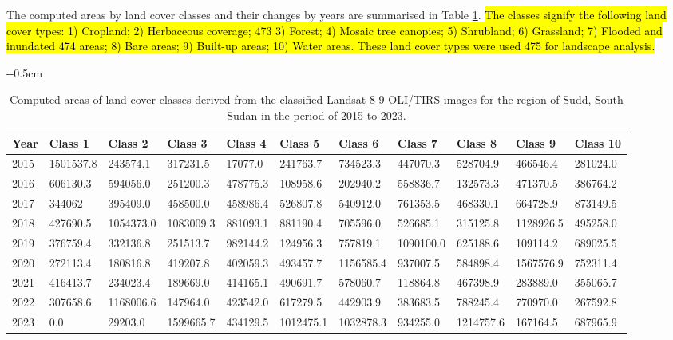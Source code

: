 \documentclass[analytics,article,submit,pdftex,moreauthors]{Definitions/mdpi}
\begin{document}
The computed areas by land cover classes and their changes by years are summarised in Table \ref{tab02}. \hl{The classes signify the following land cover types: 1) Cropland; 2) Herbaceous coverage; 473 3) Forest; 4) Mosaic tree canopies; 5) Shrubland; 6) Grassland; 7) Flooded and inundated 474 areas; 8) Bare areas; 9) Built-up areas; 10) Water areas. These land cover types were used 475 for landscape analysis. }

\begin{table}[H]
    \caption{Computed areas of land cover classes derived from the classified Landsat 8-9 OLI/TIRS images for the region of Sudd, South Sudan in the period of 2015 to 2023.\label{tab02}}
 \begin{adjustwidth}{-\extralength}{-0.5cm}
	\begin{tabularx}{\fulllength}{|l|l|l|l|l|l|l|l|l|l|l|}
    \toprule
        \textbf{Year} & \textbf{Class 1} & \textbf{Class 2} & \textbf{Class 3} & \textbf{Class 4} & \textbf{Class 5} & \textbf{Class 6} & \textbf{Class 7} & \textbf{Class 8} & \textbf{Class 9} & \textbf{Class 10} \\ \midrule
        2015 & 1501537.8 & 243574.1 & 317231.5 & 17077.0 & 241763.7 & 734523.3 & 447070.3 & 528704.9 & 466546.4 & 281024.0 \\ \hline
        2016 & 606130.3 & 594056.0 & 251200.3 & 478775.3 & 108958.6 & 202940.2 & 558836.7 & 132573.3 & 471370.5 & 386764.2 \\ \hline
        2017 & 344062 & 395409.0 & 458500.0 & 458986.4 & 526807.8 & 540912.0 & 761353.5 & 468330.1 & 664728.9 & 873149.5 \\ \hline
        2018 & 427690.5 & 1054373.0 & 1083009.3 & 881093.1 & 881190.4 & 705596.0 & 526685.1 & 315125.8 & 1128926.5 & 495258.0 \\ \hline
        2019 & 376759.4 & 332136.8 & 251513.7 & 982144.2 & 124956.3 & 757819.1 & 1090100.0 & 625188.6 & 109114.2 & 689025.5 \\ \hline
        2020 & 272113.4 & 180816.8 & 419207.8 & 402059.3 & 493457.7 & 1156585.4 & 937007.5 & 584898.4 & 1567576.9 & 752311.4 \\ \hline
        2021 & 416413.7 & 234023.4 & 189669.0 & 414165.1 & 490691.7 & 578060.7 & 118864.8 & 467398.9 & 283889.0 & 355065.7 \\ \hline
        2022 & 307658.6 & 1168006.6 & 147964.0 & 423542.0 & 617279.5 & 442903.9 & 383683.5 & 788245.4 & 770970.0 & 267592.8 \\ \hline
        2023 & 0.0 & 29203.0 & 1599665.7 & 434129.5 & 1012475.1 & 1032878.3 & 934255.0 & 1214757.6 & 167164.5 & 687965.9 \\ \hline
	\bottomrule
	\end{tabularx}
	\end{adjustwidth}
\end{table}
\end{document}
